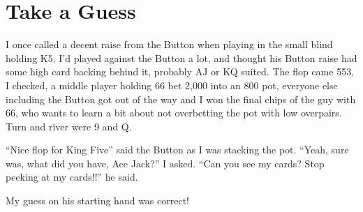 \section{Take a Guess}

I once called a decent raise from the Button when playing in the small
blind holding K5. I'd played against the Button a lot, and thought
his Button raise had some high card backing behind it, probably AJ or
KQ suited. The flop came 553, I checked, a middle player holding 66
bet 2,000 into an 800 pot, everyone else including the Button got
out of the way and I won the final chips of the guy with 66, who wants
to learn a bit about not overbetting the pot with low overpairs. Turn
and river were 9 and Q.

``Nice flop for King Five'' said the Button as I was stacking the pot.
``Yeah, sure was, what did you have, Ace Jack?'' I asked.
``Can you see my cards? Stop peeking at my cards!!'' he said.

My guess on his starting hand was correct!

